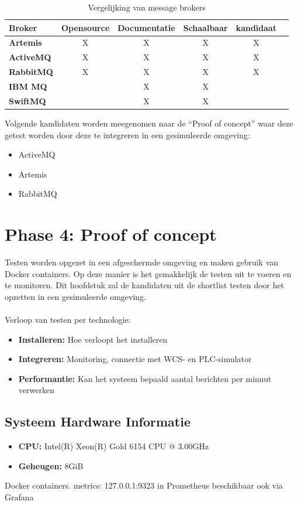 \begin{table}[h!]
  \centering
  \footnotesize
\begin{tabular}{|l|c|c|c|c|c|}
  \hline
  \textbf{Broker} & \textbf{Opensource} & \textbf{Documentatie} & \textbf{Schaalbaar} & \textbf{kandidaat}\\ \hline
  \textbf{Artemis}   & X & X & X & X \\ \hline
  \textbf{ActiveMQ}  & X & X & X & X \\ \hline
  \textbf{RabbitMQ}  & X & X & X & X \\ \hline  
  \textbf{IBM MQ}    &   & X & X &  \\ \hline 
  \textbf{SwiftMQ}   &   & X & X &  \\ \hline 
\end{tabular}
\caption{Vergelijking van message brokers}
\label{tab:vergelijking_message_brokers_should_have}
\end{table}

Volgende kandidaten worden meegenomen naar de ``Proof of concept'' waar deze getest worden door deze te integreren in een gesimuleerde omgeving:
\begin{itemize}
  \item ActiveMQ
  \item Artemis
  \item RabbitMQ
\end{itemize}
    
\section{Phase 4: Proof of concept}
Testen worden opgezet in een afgeschermde omgeving en maken gebruik van Docker containers.
Op deze manier is het gemakkelijk de testen uit te voeren en te monitoren.
Dit hoofdstuk zal de kandidaten uit de shortlist testen door het opzetten in een gesimuleerde omgeving.
\\\\
Verloop van testen per technologie:
\begin{itemize}
  \item \textbf{Installeren:} Hoe verloopt het installeren
  \item \textbf{Integreren:} Monitoring, connectie met WCS- en PLC-simulator
  \item \textbf{Performantie:} Kan het systeem bepaald aantal berichten per minuut verwerken
\end{itemize}

\subsection{Systeem Hardware Informatie}
\begin{itemize}
    \item \textbf{CPU:} Intel(R) Xeon(R) Gold 6154 CPU @ 3.00GHz
    \item \textbf{Geheugen:} 8GiB
\end{itemize}
Docker containers.
metrics: 127.0.0.1:9323 in Prometheus beschikbaar
ook via Grafana

